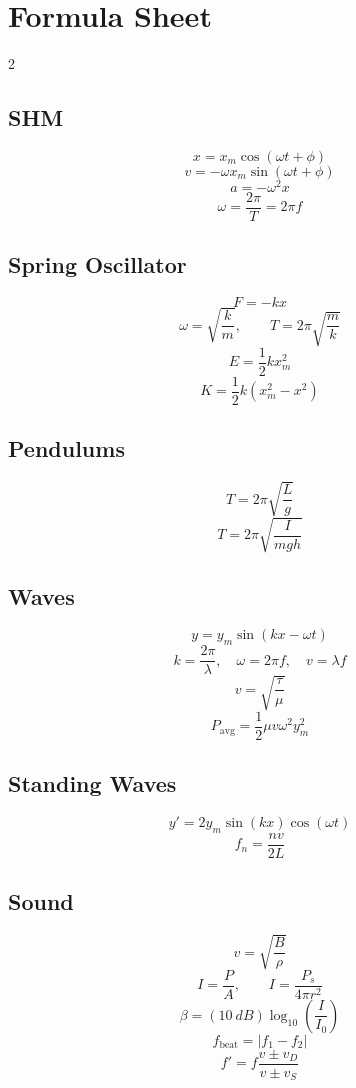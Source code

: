 \documentclass{studentnotes}
\begin{document}
\section{Formula Sheet}

\begin{multicols}{2}

\subsection*{SHM}
\[
    x=x_m\cos(\omega t+\phi)
\]
\[
    v=-\omega x_m\sin(\omega t+\phi)
\]
\[
    a=-\omega^2x
\]
\[
    \omega=\frac{2\pi}{T}=2\pi f
\]

\subsection*{Spring Oscillator}
\[
    F=-kx
\]
\[
    \omega=\sqrt{\frac{k}{m}},
    \qquad
    T=2\pi\sqrt{\frac{m}{k}}
\]
\[
    E=\frac{1}{2}kx_m^2
\]
\[
    K=\frac{1}{2}k(x_m^2-x^2)
\]

\subsection*{Pendulums}
\[
    T=2\pi\sqrt{\frac{L}{g}}
\]
\[
    T=2\pi\sqrt{\frac{I}{mgh}}
\]

\subsection*{Waves}
\[
    y=y_m\sin(kx-\omega t)
\]
\[
    k=\frac{2\pi}{\lambda},
    \quad
    \omega=2\pi f,
    \quad
    v=\lambda f
\]
\[
    v=\sqrt{\frac{\tau}{\mu}}
\]
\[
    P_{\text{avg}}=\frac{1}{2}\mu v\omega^2y_m^2
\]

\subsection*{Standing Waves}
\[
    y'=2y_m\sin(kx)\cos(\omega t)
\]
\[
    f_n=\frac{nv}{2L}
\]

\subsection*{Sound}
\[
    v=\sqrt{\frac{B}{\rho}}
\]
\[
    I=\frac{P}{A},
    \qquad
    I=\frac{P_s}{4\pi r^2}
\]
\[
    \beta=(\SI{10}{dB})\log_{10}\left(\frac{I}{I_0}\right)
\]
\[
    f_{\text{beat}}=|f_1-f_2|
\]
\[
    f'=f\frac{v\pm v_D}{v\pm v_S}
\]

\end{multicols}
\end{document}
